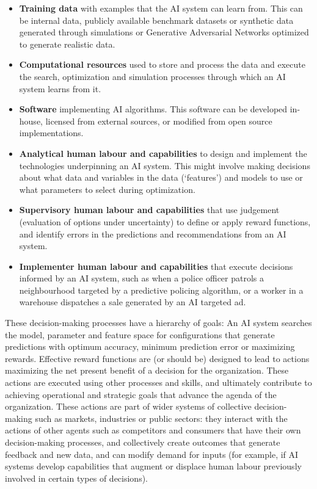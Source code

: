 \documentclass[11pt]{article}
\begin{document}
\begin{itemize}
    \item \textbf{Training data} with examples that the AI system can learn from. This can be internal data, publicly available benchmark datasets or synthetic data generated through simulations or Generative Adversarial Networks optimized to generate realistic data.
    \item \textbf{Computational resources} used to store and process the data and execute the search, optimization and simulation processes through which an AI system learns from it.
    \item \textbf{Software} implementing AI algorithms. This software can be developed in-house, licensed from external sources, or modified from open source implementations. 
    \item \textbf{Analytical human labour and capabilities} to design and implement the technologies underpinning an AI system. This might involve making decisions about what data and variables in the data (`features') and models to use or what parameters to select during optimization.
    \item \textbf{Supervisory human labour and capabilities} that use judgement (evaluation of options under uncertainty) to define or apply reward functions, and identify errors in the predictions and recommendations from an AI system.
    \item \textbf{Implementer human labour and capabilities} that execute decisions informed by an AI system, such as when a police officer patrols a neighbourhood targeted by a predictive policing algorithm, or a worker in a warehouse dispatches a sale generated by an AI targeted ad.
\end{itemize}

These decision-making processes have a hierarchy of goals: An AI system searches the model, parameter and feature space for configurations that generate predictions with optimum accuracy, minimum prediction error or maximizing rewards. Effective reward functions are (or should be) designed to lead to actions maximizing the net present benefit of a decision for the organization. These actions are executed using other processes and skills, and ultimately contribute to achieving operational and strategic goals that advance the agenda of the organization. These actions are part of wider systems of collective decision-making such as markets, industries or public sectors: they interact with the actions of other agents such as competitors and consumers that have their own decision-making processes, and collectively create outcomes that generate feedback and new data, and can modify demand for inputs (for example, if AI systems develop capabilities that augment or displace human labour previously involved in certain types of decisions). 
\end{document}
